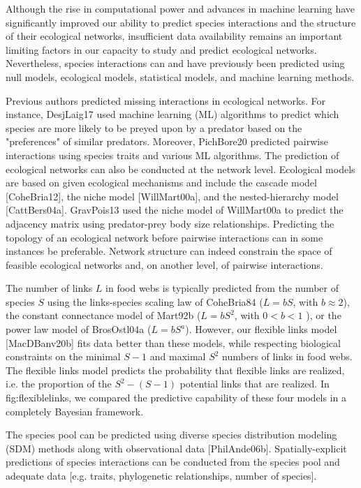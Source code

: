 Although the rise in computational power and advances in machine learning have
significantly improved our ability to predict species interactions and the
structure of their ecological networks, insufficient data availability remains
an important limiting factors in our capacity to study and predict ecological
networks. Nevertheless, species interactions can and have previously been
predicted using null models, ecological models, statistical models, and machine
learning methods.

Previous authors predicted missing interactions in ecological networks. For
instance, DesjLaig17 used machine learning (ML) algorithms to predict which
species are more likely to be preyed upon by a predator based on the
"preferences" of similar predators. Moreover, PichBore20 predicted pairwise
interactions using species traits and various ML algorithms. The prediction of
ecological networks can also be conducted at the network level. Ecological
models are based on given ecological mechanisms and include the cascade model
[CoheBria12], the niche model [WillMart00a], and the nested-hierarchy model
[CattBers04a]. GravPois13 used the niche model of WillMart00a to predict the
adjacency matrix using predator-prey body size relationships. Predicting the
topology of an ecological network before pairwise interactions can in some
instances be preferable. Network structure can indeed constrain the space of
feasible ecological networks and, on another level, of pairwise interactions.

The number of links $L$ in food webs is typically predicted from the number of
species $S$ using the links-species scaling law of CoheBria84 ($L=bS$, with
$b\approx 2$), the constant connectance model of Mart92b ($L=bS^2$, with $0 < b
< 1$ ), or the power law model of BrosOstl04a ($L=bS^a$). However, our flexible
links model [MacDBanv20b] fits data better than these models, while respecting
biological constraints on the minimal $S-1$ and maximal $S^2$ numbers of links
in food webs. The flexible links model predicts the probability that flexible
links are realized, i.e. the proportion of the $S^2 - (S-1)$ potential links
that are realized. In fig:flexiblelinks, we compared the predictive capability
of these four models in a completely Bayesian framework.  

The species pool can be predicted using diverse species distribution modeling
(SDM) methods along with observational data [PhilAnde06b]. Spatially-explicit
predictions of species interactions can be conducted from the species pool and
adequate data [e.g. traits, phylogenetic relationships, number of species].

